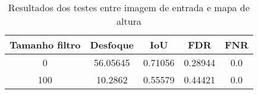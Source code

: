 \begin{table}[h]
            \centering
            \caption{Resultados dos testes entre imagem de entrada e mapa de altura}
            \label{tab:blur_error_input_output_3d}
            \begin{tabular}{|c|c|c|c|c|}
                \hline
                                Tamanho filtro & Desfoque & IoU & FDR & FNR \\
                \hline
                0 & 56.05645 & 0.71056 & 0.28944 & 0.0\\
        100 & 10.2862 & 0.55579 & 0.44421 & 0.0\\
                \hline
            \end{tabular}
        \end{table}


